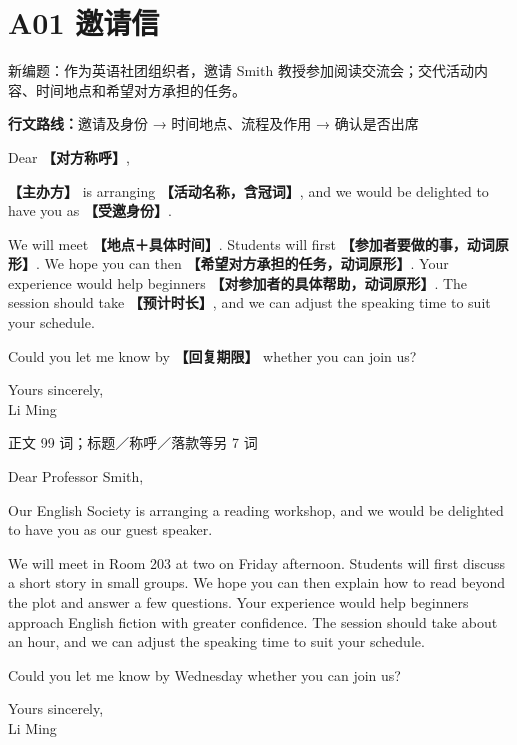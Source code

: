 \documentclass[11pt,a4paper,fontset=macnew]{ctexart}
\newenvironment{writing}{\begingroup\fontsize{10.5}{13.5}\selectfont\setlength{\parskip}{3pt}}{\par\endgroup}
\newenvironment{example}{\begingroup\fontsize{11}{14.3}\selectfont\setlength{\parskip}{4pt}}{\par\endgroup}
\begin{document}
\clearpage\section*{A01  邀请信}
{\small 新编题：作为英语社团组织者，邀请 Smith 教授参加阅读交流会；交代活动内容、时间地点和希望对方承担的任务。}\par
{\small\textbf{行文路线：}邀请及身份 → 时间地点、流程及作用 → 确认是否出席}\par
\par\vspace{4pt}{\bfseries 可替换模板}\par\nopagebreak
\begin{writing}
\noindent Dear {\bfseries 【对方称呼】},\par
{\bfseries 【主办方】} is arranging {\bfseries 【活动名称，含冠词】}, and we would be delighted to have you as {\bfseries 【受邀身份】}.

We will meet {\bfseries 【地点＋具体时间】}. Students will first {\bfseries 【参加者要做的事，动词原形】}. We hope you can then {\bfseries 【希望对方承担的任务，动词原形】}. Your experience would help beginners {\bfseries 【对参加者的具体帮助，动词原形】}. The session should take {\bfseries 【预计时长】}, and we can adjust the speaking time to suit your schedule.

Could you let me know by {\bfseries 【回复期限】} whether you can join us?

\noindent Yours sincerely,\\Li Ming\par
\end{writing}
\par\vspace{4pt}{\bfseries 完整套用示例}\par\nopagebreak
{\small 正文 99 词；标题／称呼／落款等另 7 词}\par
\begin{example}
\noindent Dear Professor Smith,\par
Our English Society is arranging a reading workshop, and we would be delighted to have you as our guest speaker.

We will meet in Room 203 at two on Friday afternoon. Students will first discuss a short story in small groups. We hope you can then explain how to read beyond the plot and answer a few questions. Your experience would help beginners approach English fiction with greater confidence. The session should take about an hour, and we can adjust the speaking time to suit your schedule.

Could you let me know by Wednesday whether you can join us?

\noindent Yours sincerely,\\Li Ming\par
\end{example}
\end{document}

